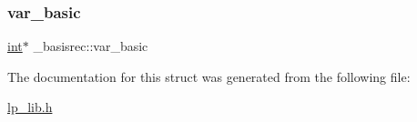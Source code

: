 \subsubsection{\texorpdfstring{var\+\_\+basic}{var\_basic}}
{\footnotesize\ttfamily \hyperlink{lp__lib_8h_adeb9ec6400320e4923ac9d836d509ddb}{int}$\ast$ \+\_\+basisrec\+::var\+\_\+basic}



The documentation for this struct was generated from the following file\+:\begin{DoxyCompactItemize}
\item 
\hyperlink{lp__lib_8h}{lp\+\_\+lib.\+h}\end{DoxyCompactItemize}
